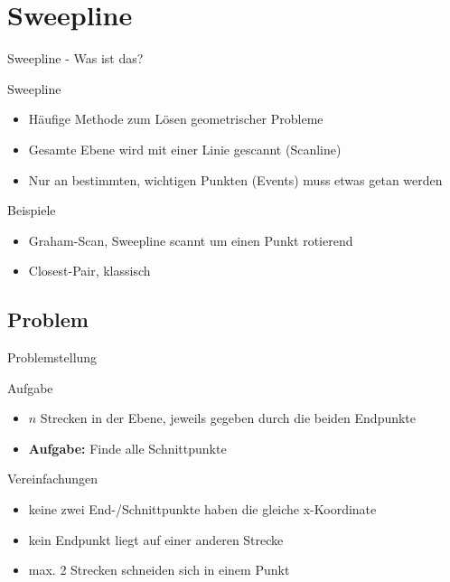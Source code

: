 \documentclass[18pt]{beamer}
\begin{document}
\section{Sweepline}
\begin{frame}{Sweepline - Was ist das?}
	\begin{block}{Sweepline} 
		\begin{itemize}
			\item Häufige Methode zum Lösen geometrischer Probleme
			\item Gesamte Ebene wird mit einer Linie gescannt (Scanline)
			\item Nur an bestimmten, wichtigen Punkten (Events) muss etwas getan werden
		\end{itemize}
	\end{block}
	\begin{exampleblock}{Beispiele}
		\begin{itemize}
			\item Graham-Scan, Sweepline scannt um einen Punkt rotierend
			\item Closest-Pair, klassisch
		\end{itemize}
	\end{exampleblock}
\end{frame}

\subsection{Problem}
\begin{frame}{Problemstellung}
	\begin{block}{Aufgabe}
		\begin{itemize}
			\item $n$ Strecken in der Ebene, jeweils gegeben durch die beiden Endpunkte
			\item \textbf{Aufgabe:} Finde alle Schnittpunkte
		\end{itemize}
	\end{block}
	
	\begin{block}{Vereinfachungen}
		\begin{itemize}
			\item keine zwei End-/Schnittpunkte haben die gleiche x-Koordinate
			\item kein Endpunkt liegt auf einer anderen Strecke
			\item max. 2 Strecken schneiden sich in einem Punkt
		\end{itemize}
	\end{block}
\end{frame}
\end{document}
